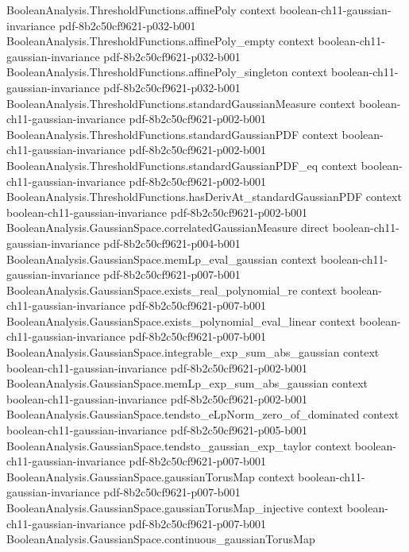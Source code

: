 \begin{lemma}
\proofstep
  {BooleanAnalysis.ThresholdFunctions.affinePoly}
  {context}
  {boolean-ch11-gaussian-invariance}
  {pdf-8b2c50cf9621-p032-b001}
\proofstep
  {BooleanAnalysis.ThresholdFunctions.affinePoly_empty}
  {context}
  {boolean-ch11-gaussian-invariance}
  {pdf-8b2c50cf9621-p032-b001}
\proofstep
  {BooleanAnalysis.ThresholdFunctions.affinePoly_singleton}
  {context}
  {boolean-ch11-gaussian-invariance}
  {pdf-8b2c50cf9621-p032-b001}
\proofstep
  {BooleanAnalysis.ThresholdFunctions.standardGaussianMeasure}
  {context}
  {boolean-ch11-gaussian-invariance}
  {pdf-8b2c50cf9621-p002-b001}
\proofstep
  {BooleanAnalysis.ThresholdFunctions.standardGaussianPDF}
  {context}
  {boolean-ch11-gaussian-invariance}
  {pdf-8b2c50cf9621-p002-b001}
\proofstep
  {BooleanAnalysis.ThresholdFunctions.standardGaussianPDF_eq}
  {context}
  {boolean-ch11-gaussian-invariance}
  {pdf-8b2c50cf9621-p002-b001}
\proofstep
  {BooleanAnalysis.ThresholdFunctions.hasDerivAt_standardGaussianPDF}
  {context}
  {boolean-ch11-gaussian-invariance}
  {pdf-8b2c50cf9621-p002-b001}
\proofstep
  {BooleanAnalysis.GaussianSpace.correlatedGaussianMeasure}
  {direct}
  {boolean-ch11-gaussian-invariance}
  {pdf-8b2c50cf9621-p004-b001}
\proofstep
  {BooleanAnalysis.GaussianSpace.memLp_eval_gaussian}
  {context}
  {boolean-ch11-gaussian-invariance}
  {pdf-8b2c50cf9621-p007-b001}
\proofstep
  {BooleanAnalysis.GaussianSpace.exists_real_polynomial_re}
  {context}
  {boolean-ch11-gaussian-invariance}
  {pdf-8b2c50cf9621-p007-b001}
\proofstep
  {BooleanAnalysis.GaussianSpace.exists_polynomial_eval_linear}
  {context}
  {boolean-ch11-gaussian-invariance}
  {pdf-8b2c50cf9621-p007-b001}
\proofstep
  {BooleanAnalysis.GaussianSpace.integrable_exp_sum_abs_gaussian}
  {context}
  {boolean-ch11-gaussian-invariance}
  {pdf-8b2c50cf9621-p002-b001}
\proofstep
  {BooleanAnalysis.GaussianSpace.memLp_exp_sum_abs_gaussian}
  {context}
  {boolean-ch11-gaussian-invariance}
  {pdf-8b2c50cf9621-p002-b001}
\proofstep
  {BooleanAnalysis.GaussianSpace.tendsto_eLpNorm_zero_of_dominated}
  {context}
  {boolean-ch11-gaussian-invariance}
  {pdf-8b2c50cf9621-p005-b001}
\proofstep
  {BooleanAnalysis.GaussianSpace.tendsto_gaussian_exp_taylor}
  {context}
  {boolean-ch11-gaussian-invariance}
  {pdf-8b2c50cf9621-p007-b001}
\proofstep
  {BooleanAnalysis.GaussianSpace.gaussianTorusMap}
  {context}
  {boolean-ch11-gaussian-invariance}
  {pdf-8b2c50cf9621-p007-b001}
\proofstep
  {BooleanAnalysis.GaussianSpace.gaussianTorusMap_injective}
  {context}
  {boolean-ch11-gaussian-invariance}
  {pdf-8b2c50cf9621-p007-b001}
\proofstep
  {BooleanAnalysis.GaussianSpace.continuous_gaussianTorusMap}

\end{lemma}
